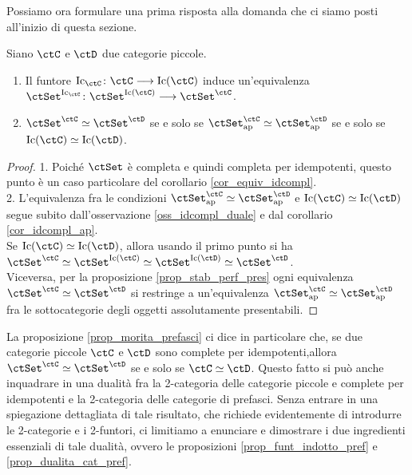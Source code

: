 Possiamo ora formulare una prima risposta alla domanda che ci siamo posti all'inizio di questa sezione.

\begin{proposition}\label{prop_morita_prefasci}
 Siano \(\ctC\) e \(\ctD\) due categorie piccole.
 \begin{enumerate}
  \item Il funtore \(\mathrm{Ic}_{\ctC} \colon \ctC \fun \mathrm{Ic}(\ctC)\) induce un'equivalenza
        \(\ctSet^{\mathrm{Ic}_{\ctC}} \colon \ctSet^{\mathrm{Ic}(\ctC)} \fun \ctSet^{\ctC}\).
  \item  \(\ctSet^{\ctC} \simeq \ctSet^{\ctD}\) se e solo se \(\ctSet^{\ctC}_{\mathrm{ap}} \simeq \ctSet^{\ctD}_{\mathrm{ap}}\)
        se e solo se \(\mathrm{Ic}(\ctC) \simeq \mathrm{Ic}(\ctD)\).
 \end{enumerate}
\end{proposition}

\begin{proof}
 1. Poiché \(\ctSet\) è completa e quindi completa per idempotenti, questo punto è un  caso particolare
 del corollario \ref{cor_equiv_idcompl}. \\
 2. L'equivalenza fra le condizioni \(\ctSet^{\ctC}_{\mathrm{ap}} \simeq \ctSet^{\ctD}_{\mathrm{ap}}\) e
 \(\mathrm{Ic}(\ctC) \simeq \mathrm{Ic}(\ctD)\) segue subito dall'osservazione \ref{oss_idcompl_duale} e dal
 corollario \ref{cor_idcompl_ap}. \\
 Se \(\mathrm{Ic}(\ctC) \simeq \mathrm{Ic}(\ctD)\), allora usando il primo punto si ha
 \(\ctSet^{\ctC} \simeq \ctSet^{\mathrm{Ic}(\ctC)} \simeq \ctSet^{\mathrm{Ic}(\ctD)} \simeq \ctSet^{\ctD}\). \\
 Viceversa, per la proposizione \ref{prop_stab_perf_pres} ogni equivalenza \(\ctSet^{\ctC} \simeq \ctSet^{\ctD}\)
 si restringe a un'equivalenza \(\ctSet^{\ctC}_{\mathrm{ap}} \simeq \ctSet^{\ctD}_{\mathrm{ap}}\) fra le sottocategorie
 degli oggetti assolutamente presentabili.
\end{proof}

\begin{remark}\label{oss_dualita}
 La proposizione \ref{prop_morita_prefasci} ci dice in particolare che, se due categorie piccole \(\ctC\) e \(\ctD\) sono complete
 per idempotenti,allora \(\ctSet^\ctC \simeq \ctSet^\ctD\) se e solo se \(\ctC \simeq \ctD\). Questo fatto si può anche inquadrare
 in una dualità fra la 2-categoria delle categorie piccole e complete per idempotenti e la 2-categoria delle categorie di prefasci.
 Senza entrare in una spiegazione dettagliata di tale risultato, che richiede evidentemente di introdurre le 2-categorie e i 2-funtori,
 ci limitiamo a enunciare e dimostrare i due ingredienti essenziali di tale dualità, ovvero le proposizioni \ref{prop_funt_indotto_pref}
 e \ref{prop_dualita_cat_pref}.
\end{remark}

